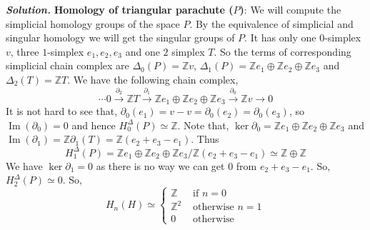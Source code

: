 \documentclass[11pt]{article}
\newcommand{\bb}[1]{\mathbb{#1}}
\newcommand{\Z}{\bb{Z}}
\newcommand{\p}{\partial}
\newcommand{\D}{\Delta}
\newcommand{\sol}{ \textbf{\textit{Solution.}} }
\begin{document}
\sol \textbf{\textsf{Homology of triangular parachute ($P$)}}:  We will compute the simplicial homology groups of the space $P$. By the equivalence of simplicial and singular homology we will get the singular groups of $P$. It has only one $0$-simplex $v$, three $1$-simplex $e_1,e_2,e_3$ and one $2$ simplex $T$. So the terms of corresponding simplicial chain complex are $\D_0(P) = \Z v$, $\D_1(P) = \Z e_1 \oplus \Z e_2 \oplus \Z e_3$ and $\D_2(T)=\Z T$. We have the following chain complex, $$\cdots 0 \xrightarrow{\p_2} \Z T \xrightarrow{\p_1}\Z e_1 \oplus \Z e_2 \oplus \Z e_3 \xrightarrow{\p_0} \Z v \xrightarrow{} 0$$ It is not hard to see that, $\p_0(e_1) = v-v =\p_0(e_2) = \p_0(e_3)$, so $\operatorname{Im}(\p_0) = 0$ and hence $H_0^{\D}(P) \simeq \Z$. Note that, $\ker \p_0 = \Z e_1 \oplus \Z e_2 \oplus \Z e_3$ and $\operatorname{Im} (\p_1) = \Z \p_1(T) = \Z (e_2+e_3-e_1)$. Thus $$H_1^{\D}(P)= \Z e_1 \oplus \Z e_2 \oplus \Z e_3 / \Z (e_2+e_3-e_1) \simeq \Z \oplus \Z$$ We have $\ker \p_1 = 0$ as there is no way we can get $0$ from $e_2+e_3-e_1$. So, $H_2^{\D}(P) \simeq 0$. So, $$H_n(H) \simeq \begin{cases}
   \Z & \text{ if } n= 0 \\
   \Z^2 &  \text{ otherwise } n=1 \\
   0 & \text{ otherwise }
 \end{cases}$$
\end{document}
